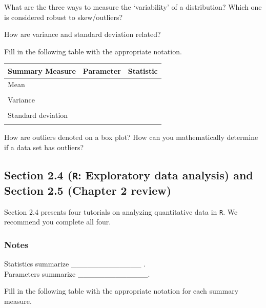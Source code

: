 \documentclass[
]{report}
\newcommand{\rgs}{\vspace{12pt}} %
\begin{document}
What are the three ways to measure the `variability' of a distribution? Which one is considered robust to skew/outliers?
\rgs

How are variance and standard deviation related?
\rgs

Fill in the following table with the appropriate notation.

\begin{center}
\begin{tabular}{|l|p{2in}|p{2in}|} \hline
Summary Measure & Parameter & Statistic \\ \hline
Mean & & \\ 
& & \\ \hline
Variance & & \\ 
& & \\ \hline
Standard deviation & & \\ 
& & \\ \hline
\end{tabular}
\end{center}

How are outliers denoted on a box plot? How can you mathematically determine if a data set has outliers?
\rgs

\hypertarget{section-2.4-r-exploratory-data-analysis-and-section-2.5-chapter-2-review}{%
\subsection*{\texorpdfstring{Section 2.4 (\texttt{R}: Exploratory data analysis) and Section 2.5 (Chapter 2 review)}{Section 2.4 (R: Exploratory data analysis) and Section 2.5 (Chapter 2 review)}}\label{section-2.4-r-exploratory-data-analysis-and-section-2.5-chapter-2-review}}

Section 2.4 presents four tutorials on analyzing quantitative data in \texttt{R}. We recommend you complete all four.

\hypertarget{notes-7}{%
\subsubsection*{Notes}\label{notes-7}}

Statistics summarize \_\_\_\_\_\_\_\_\_\_\_\_\_ .\\
Parameters summarize \_\_\_\_\_\_\_\_\_\_\_\_\_.

Fill in the following table with the appropriate notation for each summary measure.
\end{document}
